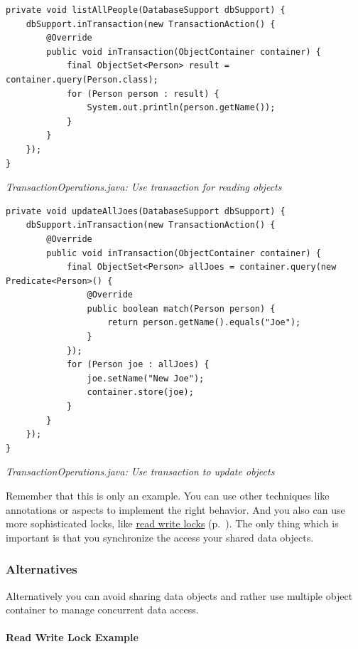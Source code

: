 \begin{lstlisting}
private void listAllPeople(DatabaseSupport dbSupport) {
    dbSupport.inTransaction(new TransactionAction() {
        @Override
        public void inTransaction(ObjectContainer container) {
            final ObjectSet<Person> result = container.query(Person.class);
            for (Person person : result) {
                System.out.println(person.getName());
            }
        }
    });
}
\end{lstlisting}

{\small\itshape TransactionOperations.java: Use transaction for reading objects\par}
\medskip

\begin{lstlisting}
private void updateAllJoes(DatabaseSupport dbSupport) {
    dbSupport.inTransaction(new TransactionAction() {
        @Override
        public void inTransaction(ObjectContainer container) {
            final ObjectSet<Person> allJoes = container.query(new Predicate<Person>() {
                @Override
                public boolean match(Person person) {
                    return person.getName().equals("Joe");
                }
            });
            for (Person joe : allJoes) {
                joe.setName("New Joe");
                container.store(joe);
            }
        }
    });
}
\end{lstlisting}

{\small\itshape TransactionOperations.java: Use transaction to update objects\par}
\medskip

Remember that this is only an example. You can use other techniques like annotations or aspects to implement the right behavior. And you also can use more sophisticated locks, like \hyperref[ref:advanced-topics-concurrency-read-write-lock-example]{read write locks} (p.~\pageref{ref:advanced-topics-concurrency-read-write-lock-example}). The only thing which is important is that you synchronize the access your shared data objects.

\subsubsection*{Alternatives}

Alternatively you can avoid sharing data objects and rather use multiple object container to manage concurrent data access.

\paragraph{Read Write Lock Example}
\label{ref:advanced-topics-concurrency-read-write-lock-example}

